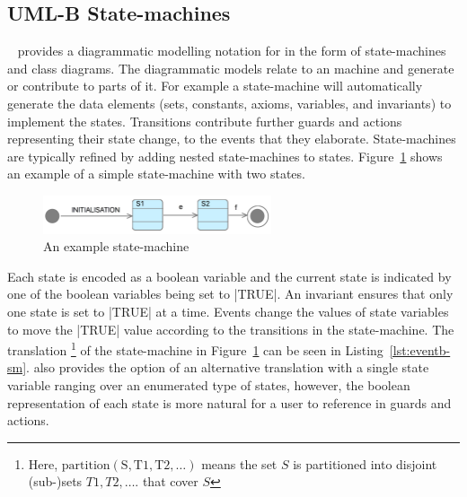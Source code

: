 
\subsection{UML-B State-machines}
\label{sec:iumlb}

\UMLB~\cite{said15:umlbSosym,snook14:iumlbStatem,snook06umlbTosem} provides a diagrammatic modelling notation for \EventB in the form of state-machines and class diagrams. 
The diagrammatic models relate to an \EventB machine and generate or contribute to parts of it. 
For example a state-machine will automatically generate the \EventB data elements (sets, constants, axioms, variables, and invariants) to implement the states. 
Transitions contribute further guards and actions representing their state change, to the events that they elaborate.  
State-machines are typically refined by adding nested state-machines to states.
Figure~\ref{fig:iumlb-sm} shows an example of a simple state-machine with two states.
\begin{figure}[!h]
	\vspace{-.5cm}
	\centering
	\includegraphics[width=0.6\textwidth]{figures/iumlb-SM}
	\caption{An example \UMLB state-machine}
	\label{fig:iumlb-sm}
	\vspace{-.5cm}
\end{figure}

Each state is encoded as a boolean variable and the current state is indicated by one of the boolean variables being set to |TRUE|. 
An invariant ensures that only one state is set to |TRUE| at a time.
Events change the values of state variables to move the |TRUE| value according to the transitions in the state-machine.  
The \EventB translation%
%
\footnote{%
  Here, $\mathrm{partition(S, T1, T2, \ldots)}$ means the set $S$ is partitioned into disjoint (sub-)sets $T1, T2, \ldots$.
that cover $S$} 
of the state-machine in Figure~\ref{fig:iumlb-sm} can be seen in Listing~\ref{lst:eventb-sm}.
\UMLB also provides the option of an alternative translation with a single state variable ranging over an enumerated type of states, however, the boolean representation of each state is more natural for a user to reference in \SCXML guards and actions.
	
